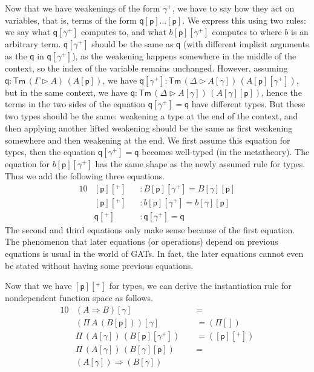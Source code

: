 \documentclass[sigplan,10pt,anonymous,review]{acmart}\settopmatter{printfolios=true,printccs=false,printacmref=false}
\newcommand{\Ra}{\Rightarrow}
\newcommand{\Tm}{\mathsf{Tm}}
\newcommand{\p}{\mathsf{p}}
\newcommand{\q}{\mathsf{q}}
\newcommand{\ext}{\mathop{\triangleright}}
\begin{document}
Now that we have weakenings of the form $\gamma^+$, we have to say how
they act on variables, that is, terms of the form
$\q[\p]\dots[\p]$. We express this using two rules: we say what
$\q[\gamma^+]$ computes to, and what $b[\p][\gamma^+]$ computes to
where $b$ is an arbitrary term. $\q[\gamma^+]$ should be the same as
$\q$ (with different implicit arguments as the $\q$ in
$\q[\gamma^+]$), as the weakening happens somewhere in the middle of
the context, so the index of the variable remains unchanged. However,
assuming $\q:\Tm\,(\Gamma\ext A)\,(A[\p])$, we have $\q[\gamma^+] :
\Tm\,(\Delta\ext A[\gamma])\,(A[\p][\gamma^+])$, but in the same
context, we have $\q : \Tm\,(\Delta\ext A[\gamma])\,(A[\gamma][\p])$,
hence the terms in the two sides of the equation $\q[\gamma^+] = \q$
have different types. But these two types should be the same:
weakening a type at the end of the context, and then applying another
lifted weakening should be the same as first weakening somewhere and
then weakening at the end. We first assume this equation for types,
then the equation $\q[\gamma^+] = \q$ becomes well-typed (in the
metatheory). The equation for $b[\p][\gamma^+]$ has the same shape as
the newly assumed rule for types. Thus we add the following three
equations.
\begin{alignat*}{10}
& [\p][^+] && : B[\p][\gamma^+] = B[\gamma][\p] \\
& [\p][^+] && : b[\p][\gamma^+] = b[\gamma][\p] \\
& \q[^+] && : \q[\gamma^+] = \q
\end{alignat*}
The second and third equations only make sense because of the first
equation. The phenomenon that later equations (or operations) depend
on previous equations is usual in the world of GATs. In fact, the
later equations cannot even be stated without having some previous
equations.

Now that we have $[\p][^+]$ for types, we can derive the instantiation
rule for nondependent function space as follows.
\begin{alignat*}{10}
  & (A\Ra B)[\gamma] && {=} \\
  & (\Pi\,A\,(B[\p]))[\gamma] && {=}(\Pi[]) \\
  & \Pi\,(A[\gamma])\,(B[\p][\gamma^+])\,\, && {=}([\p][^+]) \\
  & \Pi\,(A[\gamma])\,(B[\gamma][\p]) && {=} \\
  & (A[\gamma])\Ra(B[\gamma])
\end{alignat*}
\end{document}
